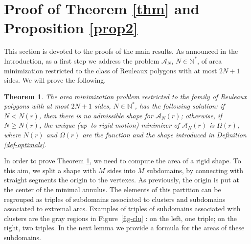 \documentclass[11pt]{article}
\numberwithin{equation}{section}
\let\mathcal\mathscr
\theoremstyle{plain}
\newtheorem{theorem}{Theorem}[section]
\theoremstyle{definition}
\newcommand\A{\mathcal A}
\begin{document}
\section{Proof of Theorem \ref{thm} and Proposition \ref{prop2}}\label{sec-proof}

This section is devoted to the proofs of the main results. As announced in the Introduction, as a first step we address the problem $\A_N$, $N\in \mathbb N^*$, of area minimization restricted to the class of Reuleaux polygons with at most $2N+1$ sides. We will prove the following.

\begin{theorem}\label{thm-density}
The area minimization problem restricted to the family of Reuleaux polygons with at most $2N+1$ sides, $N\in \mathbb N^*$, has the following solution: {if $N<N(r)$, then there is no admissible shape for $\A_N(r)$; otherwise, if $N\geq N(r)$, the unique (up~to rigid motion) minimizer of $\A_N(r)$ is $\Omega(r)$,}
where $N(r)$ and $\Omega(r)$ are the function and the shape introduced in Definition \ref{def-optimals}.
\end{theorem}
In order to prove Theorem \ref{thm-density}, we need to compute the area of a rigid shape. To this aim, we split a shape with $M$ sides into $M$ subdomains, by connecting with straight segments the origin to the vertexes. As previously, the origin is put at the center
of the minimal annulus. The elements of this partition can be regrouped as triples of subdomains associated to clusters and subdomains associated to extremal arcs. {Examples of triples of subdomains associated with clusters are the gray regions in Figure~\ref{fig-clu} : on the left, one triple; on the right, two triples.} In the next lemma we provide a formula for the areas of these subdomains.
\end{document}
